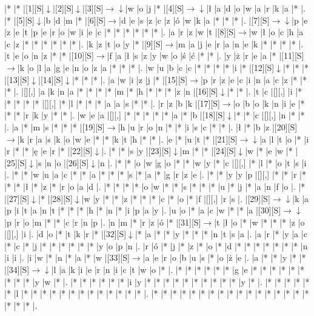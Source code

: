 \documentclass[11pt]{article}
\newcommand\drarr{$\rightarrow \!\!\!\!\! \downarrow$}
\newcommand\rarr{$\rightarrow$}
\newcommand\darr{$\downarrow$}
\begin{document}
\noindent\begin{Puzzle}{19}{33}|*	|*	|[1][S]\darr	|[2][S]\darr	|[3][S]\drarr	|w	|o	|j	|*	|[4][S]\drarr	|ł	|a	|d	|o	|w	|a	|r	|k	|a	|*	|.
|*	|[5][S]\darr	|b	|d	|m	|*	|[6][S]\rarr	|d	|e	|s	|z	|c	|z	|ó	|w	|k	|a	|*	|*	|*	|.
|[7][S]\drarr	|p	|e	|z	|e	|t	|p	|e	|r	|o	|w	|i	|e	|c	|*	|*	|*	|*	|*	|*	|.
|a	|r	|z	|w	|t	|[8][S]\rarr	|w	|ł	|o	|c	|h	|a	|c	|z	|*	|*	|*	|*	|*	|*	|.
|k	|z	|t	|o	|y	|*	|[9][S]\rarr	|m	|a	|j	|e	|r	|a	|n	|e	|k	|*	|*	|*	|*	|.
|t	|e	|o	|n	|z	|*	|*	|[10][S]\rarr	|f	|a	|ł	|s	|z	|y	|w	|o	|ś	|ć	|*	|*	|.
|y	|ż	|r	|e	|a	|*	|[11][S]\rarr	|k	|o	|l	|a	|g	|e	|n	|o	|z	|a	|*	|*	|*	|.
|w	|u	|b	|c	|c	|*	|*	|*	|*	|i	|*	|[12][S]\darr	|*	|*	|*	|[13][S]\darr	|[14][S]\darr	|*	|*	|*	|.
|a	|w	|i	|z	|j	|*	|[15][S]\rarr	|p	|r	|z	|e	|c	|i	|n	|a	|c	|z	|*	|*	|*	|.
|[][,]{ }	|a	|k	|n	|a	|*	|*	|*	|*	|m	|*	|h	|*	|*	|*	|z	|n	|[16][S]\darr	|*	|*	|.
|t	|c	|[][,]{ }	|i	|*	|*	|*	|*	|*	|[][,]{ }	|*	|l	|*	|*	|*	|a	|a	|s	|*	|*	|.
|r	|z	|b	|k	|[17][S]\rarr	|o	|b	|o	|k	|n	|i	|e	|*	|*	|*	|r	|k	|y	|*	|*	|.
|w	|e	|a	|[][,]{ }	|*	|*	|*	|*	|*	|a	|*	|b	|[18][S]\darr	|*	|*	|c	|[][,]{ }	|n	|*	|*	|.
|a	|*	|m	|s	|*	|*	|*	|[19][S]\rarr	|h	|u	|r	|o	|n	|*	|*	|i	|s	|c	|*	|*	|.
|ł	|*	|b	|z	|[20][S]\rarr	|k	|r	|a	|s	|k	|o	|w	|e	|*	|*	|k	|t	|h	|*	|*	|.
|e	|*	|u	|t	|*	|[21][S]\drarr	|a	|l	|t	|o	|*	|i	|r	|*	|*	|ę	|e	|r	|*	|[22][S]\darr	|.
|*	|*	|s	|y	|[23][S]\darr	|m	|*	|*	|[24][S]\darr	|w	|*	|e	|w	|*	|[25][S]\darr	|s	|n	|o	|[26][S]\darr	|n	|.
|*	|*	|o	|w	|g	|o	|*	|*	|w	|y	|*	|c	|[][,]{ }	|*	|l	|*	|o	|t	|s	|i	|.
|*	|*	|w	|n	|a	|c	|*	|*	|a	|*	|*	|*	|s	|*	|a	|*	|g	|r	|z	|e	|.
|*	|*	|y	|y	|p	|[][,]{ }	|*	|*	|r	|*	|*	|*	|ł	|*	|z	|*	|r	|o	|a	|d	|.
|*	|*	|*	|*	|o	|w	|*	|*	|s	|*	|*	|*	|u	|*	|j	|*	|a	|n	|f	|o	|.
|*	|[27][S]\darr	|*	|[28][S]\darr	|w	|y	|*	|*	|z	|*	|*	|*	|c	|*	|o	|*	|f	|[][,]{ }	|r	|s	|.
|[29][S]\drarr	|k	|a	|p	|i	|t	|a	|n	|t	|*	|*	|*	|h	|*	|n	|*	|i	|p	|a	|y	|.
|u	|o	|*	|a	|c	|w	|*	|*	|a	|[30][S]\drarr	|p	|r	|o	|m	|*	|*	|c	|r	|n	|p	|.
|n	|m	|*	|r	|z	|ó	|*	|[31][S]\rarr	|t	|ł	|o	|*	|w	|*	|*	|*	|z	|o	|[][,]{ }	|i	|.
|d	|o	|*	|t	|k	|r	|*	|[32][S]\darr	|*	|a	|*	|*	|y	|*	|*	|*	|n	|t	|s	|a	|.
|a	|r	|*	|y	|a	|c	|*	|c	|*	|j	|*	|*	|*	|*	|*	|*	|y	|o	|p	|n	|.
|r	|ó	|*	|j	|*	|z	|*	|o	|*	|d	|*	|*	|*	|*	|*	|*	|*	|n	|i	|i	|.
|i	|w	|*	|n	|*	|a	|*	|w	|[33][S]\rarr	|a	|e	|r	|o	|b	|u	|s	|*	|o	|ż	|e	|.
|a	|*	|*	|y	|*	|*	|[34][S]\drarr	|l	|a	|k	|i	|e	|r	|n	|i	|c	|t	|w	|o	|*	|.
|*	|*	|*	|*	|*	|*	|g	|e	|*	|*	|*	|*	|*	|*	|*	|*	|*	|y	|w	|*	|.
|*	|*	|*	|*	|*	|*	|i	|y	|*	|*	|*	|*	|*	|*	|*	|*	|*	|*	|y	|*	|.
|*	|*	|*	|*	|*	|*	|l	|*	|*	|*	|*	|*	|*	|*	|*	|*	|*	|*	|*	|*	|.
|*	|*	|*	|*	|*	|*	|*	|*	|*	|*	|*	|*	|*	|*	|*	|*	|*	|*	|*	|*	|.\end{Puzzle}
\end{document}

